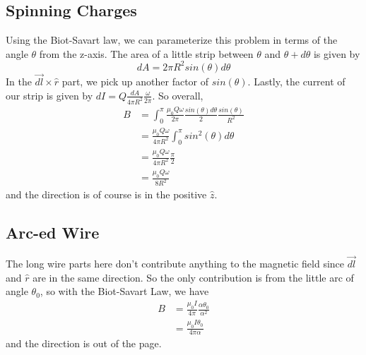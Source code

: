 \documentclass{article}
\begin{document}
\newpage

\subsection{Spinning Charges}

Using the Biot-Savart law, we can parameterize this problem in terms of the angle $\theta$ from the z-axis. The area of a little strip between $\theta$ and $\theta + d\theta$ is given by
\begin{equation}
dA = 2\pi R^2sin(\theta)d\theta
\end{equation}
In the $\vec{dl}\times\hat{r}$ part, we pick up another factor of $sin(\theta)$. Lastly, the current of our strip is given by $dI = Q\frac{dA}{4\pi R^2}\frac{\omega}{2\pi}$. So overall,
\begin{align*}
B &= \int_{0}^{\pi} \frac{\mu_0 Q\omega}{2\pi}\frac{sin(\theta)d\theta}{2}\frac{sin(\theta)}{R^2} \\
&= \frac{\mu_0 Q\omega}{4\pi R^2}\int_{0}^{\pi} sin^2(\theta)d\theta \\
&= \frac{\mu_0 Q\omega}{4\pi R^2}\frac{\pi}{2} \\
&= \frac{\mu_0 Q\omega}{8 R^2}
\end{align*}
and the direction is of course is in the positive $\hat{z}$.

\newpage

\subsection{Arc-ed Wire}

The long wire parts here don't contribute anything to the magnetic field since $\vec{dl}$ and $\hat{r}$ are in the same direction. So the only contribution is from the little arc of angle $\theta_0$, so with the Biot-Savart Law, we have
\begin{align*}
B &= \frac{\mu_0 I}{4\pi}\frac{\alpha\theta_0}{\alpha^2} \\
&= \frac{\mu_0 I \theta_0}{4\pi\alpha}
\end{align*}
and the direction is out of the page.
\end{document}
